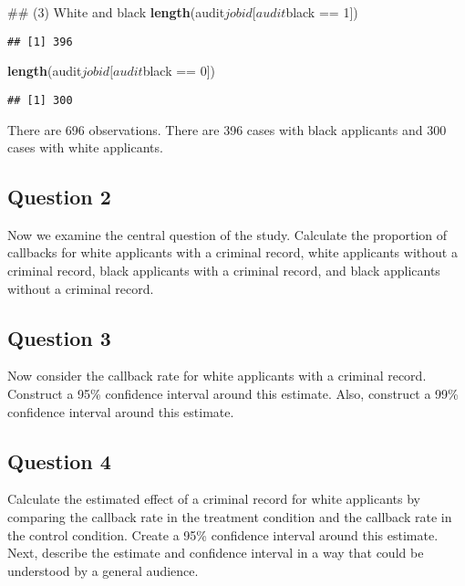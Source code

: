 \documentclass[]{article}
\newenvironment{Shaded}{\begin{snugshade}}{\end{snugshade}}
\newcommand{\KeywordTok}[1]{\textcolor[rgb]{0.13,0.29,0.53}{\textbf{{#1}}}}
\newcommand{\DecValTok}[1]{\textcolor[rgb]{0.00,0.00,0.81}{{#1}}}
\newcommand{\StringTok}[1]{\textcolor[rgb]{0.31,0.60,0.02}{{#1}}}
\newcommand{\NormalTok}[1]{{#1}}
\begin{document}
\begin{Shaded}
\begin{Highlighting}[]
\NormalTok{## (3) White and black}
\KeywordTok{length}\NormalTok{(audit$jobid[audit$black ==}\StringTok{ }\DecValTok{1}\NormalTok{])}
\end{Highlighting}
\end{Shaded}

\begin{verbatim}
## [1] 396
\end{verbatim}

\begin{Shaded}
\begin{Highlighting}[]
\KeywordTok{length}\NormalTok{(audit$jobid[audit$black ==}\StringTok{ }\DecValTok{0}\NormalTok{])}
\end{Highlighting}
\end{Shaded}

\begin{verbatim}
## [1] 300
\end{verbatim}

There are 696 observations. There are 396 cases with black applicants
and 300 cases with white applicants.

\subsection{Question 2}\label{question-2}

Now we examine the central question of the study. Calculate the
proportion of callbacks for white applicants with a criminal record,
white applicants without a criminal record, black applicants with a
criminal record, and black applicants without a criminal record.

\subsection{Question 3}\label{question-3}

Now consider the callback rate for white applicants with a criminal
record. Construct a 95\% confidence interval around this estimate. Also,
construct a 99\% confidence interval around this estimate.

\subsection{Question 4}\label{question-4}

Calculate the estimated effect of a criminal record for white applicants
by comparing the callback rate in the treatment condition and the
callback rate in the control condition. Create a 95\% confidence
interval around this estimate. Next, describe the estimate and
confidence interval in a way that could be understood by a general
audience.
\end{document}
